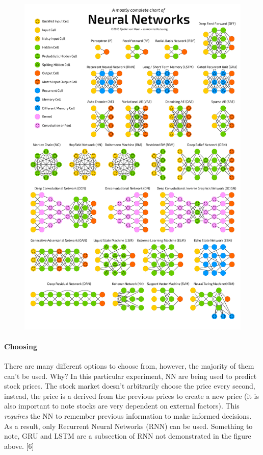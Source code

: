 \documentclass[12pt]{article}
\begin{document}
\begin{figure}[H]
  \includegraphics[width=\linewidth]{images/DifferentNN.png}
\end{figure}

\paragraph{Choosing}
There are many different options to choose from, however, the majority of them can't be used. Why? In this particular experiment, NN are being used to predict stock prices. The stock market doesn't arbitrarily choose the price every second, instead, the price is a derived from the previous prices to create a new price (it is also important to note stocks are very dependent on external factors). This \textit{requires} the NN to remember previous information to make informed decisions. As a result, only Recurrent Neural Networks (RNN) can be used. Something to note, GRU and LSTM are a subsection of RNN not demonstrated in the figure above. [6]  \cite{tch_2017}
\end{document}
